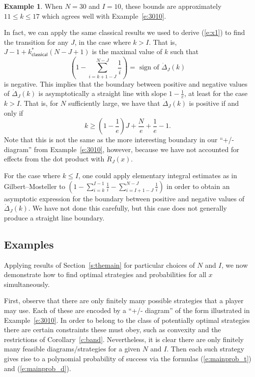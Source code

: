 \documentclass[11pt]{amsart}   %
\theoremstyle{definition}
\newtheorem{example}[theorem]{Example}
\theoremstyle{remark}
\numberwithin{equation}{section}
\theoremstyle{theorem}
\begin{document}
\begin{example}
When $N = 30$ and $I = 10$, these bounds are approximately $11 \leq k \leq 17$ which agrees well with Example~\ref{e:3010}.
\end{example}

In fact, we can apply the same classical results we used to derive (\ref{e:x1}) to find the transition for any $J$, in the case where $k > I$.  That is, $J-1 + k^\ast_{\mathsf{classical}}(N-J+1)$ is the maximal value of $k$ such that 
\[ \left( 1-\sum_{i=k+1-J}^{N-J} \frac{1}{i} \right) = \text{ sign of } \dot\Delta_J(k) \]
is negative.  This implies that the boundary between positive and negative values of $\dot\Delta_J(k)$ is asymptotically a straight line with slope $1-\frac{1}{e}$, at least for the case $k > I$.  That is, for $N$ sufficiently large, we have that $\dot\Delta_J(k)$ is positive if and only if 
\[ k \geq \left(1-\frac{1}{e}\right) J + \frac{N}{e} + \frac{1}{e} - 1. \]
Note that this is not the same as the more interesting boundary in our ``+/- diagram'' from Example~\ref{e:3010}, however, because we have not accounted for effects from the dot product with $\dot{R}_J(x)$.

For the case where $k \leq I$, one could apply elementary integral estimates as in Gilbert--Mosteller \cite{gilbert--mosteller} to
$\left( 1-\sum_{i=k}^{I-1} \frac{1}{i}-\sum_{i=I+1-J}^{N-J} \frac{1}{i} \right)$
in order to obtain an asymptotic expression for the boundary between positive and negative values of $\dot\Delta_J(k)$.  We have not done this carefully, but this case does not generally produce a straight line boundary.


\subsection{Examples}

Applying results of Section~\ref{s:themain} for particular choices of $N$ and $I$, we now demonstrate how to find optimal strategies and probabilities for all $x$ simultaneously.  

First, observe that there are only finitely many possible strategies that a player may use.  Each of these are encoded by a ``+/- diagram'' of the form illustrated in Example~\ref{e:3010}.  In order to belong to the class of potentially optimal strategies there are certain constraints these must obey, such as convexity and the restrictions of Corollary~\ref{c:band}.  Nevertheless, it is clear there are only finitely many feasible diagrams/strategies for a given $N$ and $I$.  Then each such strategy gives rise to a polynomial probability of success via the formulas (\ref{e:mainprob_t}) and (\ref{e:mainprob_d}).
\end{document}
